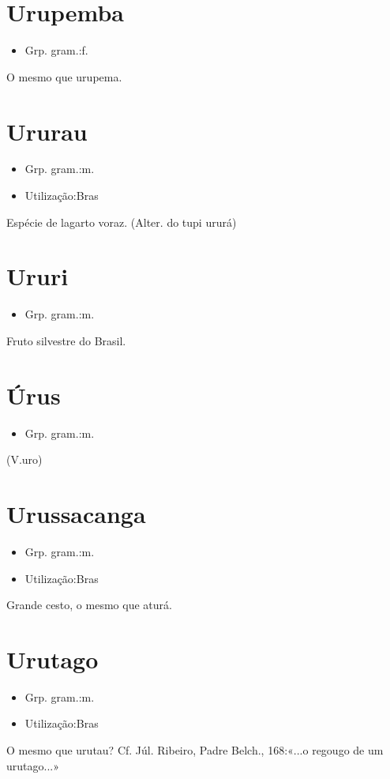 \documentclass{article}
\begin{document}
\section{Urupemba}
\begin{itemize}
\item {Grp. gram.:f.}
\end{itemize}
O mesmo que \textunderscore urupema\textunderscore .
\section{Ururau}
\begin{itemize}
\item {Grp. gram.:m.}
\end{itemize}
\begin{itemize}
\item {Utilização:Bras}
\end{itemize}
Espécie de lagarto voraz.
(Alter. do tupi \textunderscore ururá\textunderscore )
\section{Ururi}
\begin{itemize}
\item {Grp. gram.:m.}
\end{itemize}
Fruto silvestre do Brasil.
\section{Úrus}
\begin{itemize}
\item {Grp. gram.:m.}
\end{itemize}
(V.uro)
\section{Urussacanga}
\begin{itemize}
\item {Grp. gram.:m.}
\end{itemize}
\begin{itemize}
\item {Utilização:Bras}
\end{itemize}
Grande cesto, o mesmo que \textunderscore aturá\textunderscore .
\section{Urutago}
\begin{itemize}
\item {Grp. gram.:m.}
\end{itemize}
\begin{itemize}
\item {Utilização:Bras}
\end{itemize}
O mesmo que \textunderscore urutau\textunderscore ? Cf. Júl. Ribeiro, \textunderscore Padre Belch.\textunderscore , 168:«\textunderscore ...o regougo de um urutago...\textunderscore »
\end{document}
